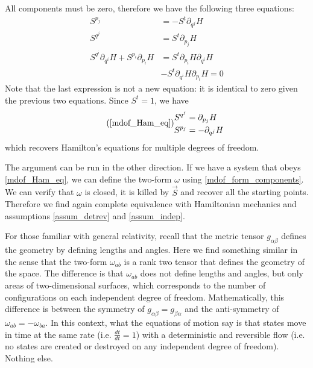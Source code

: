\documentclass[10pt,twocolumn, nofootinbib]{revtex4-2}
\begin{document}
All components must be zero, therefore we have the following three equations:
\begin{equation}
\begin{aligned}
	S^{p_j} &= - S^{t} \partial_{q^j} H \\
	S^{q^j} &= S^{t}\partial_{p_j} H \\
	S^{q^i} \partial_{q^i} H + S^{p_i} \partial_{p_i} H &= S^{t}\partial_{p_i} H \partial_{q^i} H \\
	& - S^{t} \partial_{q^i} H \partial_{p_i} H = 0
\end{aligned}
\end{equation}
Note that the last expression is not a new equation: it is identical to zero given the previous two equations. Since $S^t = 1$, we have
\begin{equation}
	\tag*{(\ref{mdof_Ham_eq})}
\begin{aligned}
	S^{q^j} &= \partial_{p_j} H \\
	S^{p_j} &= - \partial_{q^j} H 
\end{aligned}
\end{equation}
which recovers Hamilton's equations for multiple degrees of freedom.

The argument can be run in the other direction. If we have a system that obeys \ref{mdof_Ham_eq}, we can define the two-form $\omega$ using \ref{mdof_form_components}. We can verify that $\omega$ is closed, it is killed by $\vec{S}$ and recover all the starting points. Therefore we find again complete equivalence with Hamiltonian mechanics and assumptions \ref{assum_detrev} and \ref{assum_indep}.

For those familiar with general relativity, recall that the metric tensor $g_{\alpha\beta}$ defines the geometry by defining lengths and angles. Here we find something similar in the sense that the two-form $\omega_{ab}$ is a rank two tensor that defines the geometry of the space. The difference is that $\omega_{ab}$ does not define lengths and angles, but only areas of two-dimensional surfaces, which corresponds to the number of configurations on each independent degree of freedom. Mathematically, this difference is between the symmetry of $g_{\alpha\beta} = g_{\beta\alpha}$ and the anti-symmetry of $\omega_{ab} = -\omega_{ba}$. In this context, what the equations of motion say is that states move in time at the same rate (i.e. $\frac{dt}{dt} = 1$) with a deterministic and reversible flow (i.e. no states are created or destroyed on any independent degree of freedom). Nothing else.
\end{document}
